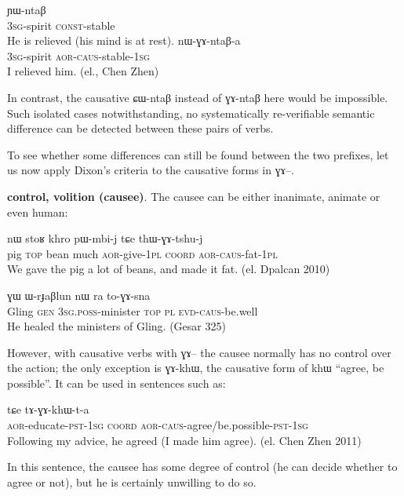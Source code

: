 \documentclass[oldfontcommands,oneside,a4paper,11pt]{memoir}
\newcommand{\ipa}[1]{{\phon #1}} %
\newcommand{\aor}{\textsc{aor}}
\newcommand{\caus}{\textsc{caus}}
\newcommand{\coord}{\textsc{coord}}
\newcommand{\const}{\textsc{const}}
\newcommand{\evd}{\textsc{evd}}
\newcommand{\gen}{\textsc{gen}}
\newcommand{\pl}{\textsc{pl}}
\newcommand{\poss}{\textsc{poss}}
\newcommand{\pst}{\textsc{pst}}
\newcommand{\sg}{\textsc{sg}}
\newcommand{\topic}{\textsc{top}}
\begin{document}
    \begin{exe}
   \ex 
  \gll    \ipa{ɯ-sɯm} \ipa{ɲɯ-ntaβ}   \\
  3\sg{}-spirit \const{}-stable \\
 \glt   He is relieved (his mind is at rest).
\gll    \ipa{ɯ-sɯm} \ipa{nɯ-ɣɤ-ntaβ-a}   \\
  3\sg{}-spirit \aor{}-\caus{}-stable-1\sg{} \\
 \glt   I relieved him. (el., Chen Zhen)
   \end{exe} 
In contrast, the causative \ipa{ɕɯ-ntaβ} instead of \ipa{ɣɤ-ntaβ} here would be impossible. Such isolated cases notwithstanding, no systematically re-verifiable semantic difference can be detected between these pairs of verbs.




To see whether some differences can still be found between the two prefixes, let us now apply Dixon's criteria to the causative forms in \ipa{ɣɤ}--.

 \textbf{control, volition (causee)}. The causee can be either inanimate, animate or even human:
   \begin{exe}
   \ex 
\gll  \ipa{paʁ}  	\ipa{nɯ}  	\ipa{stoʁ}  	\ipa{khro}  	\ipa{pɯ-mbi-j}  	\ipa{tɕe}  	\ipa{thɯ-ɣɤ-tshu-j}  \\
 pig \topic{} bean much \aor{}-give-1\pl{} \coord{} \aor{}-\caus{}-fat-1\pl{}\\
 \glt We gave the pig a lot of beans, and made it fat. (el. Dpalcan 2010)
   \end{exe} 
    \begin{exe}
   \ex 
\gll \ipa{ʁlaŋ}  	\ipa{ɣɯ}  	\ipa{ɯ-rɟaβlun}  	\ipa{nɯ}  	\ipa{ra}  	\ipa{to-ɣɤ-sna}      \\
Gling \gen{} 3\sg{}.\poss{}-minister \topic{} \pl{} \evd{}-\caus{}-be.well  \\
 \glt  He healed the ministers of Gling. (Gesar 325)
   \end{exe} 

   However, with causative verbs with \ipa{ɣɤ}--   the causee normally has no control over the action; the only exception is \ipa{ɣɤ-khɯ}, the causative form of \ipa{khɯ} ``agree, be possible''. It can be used in sentences such as:
   \begin{exe}
   \ex 
\gll    \ipa{tɤ-ndzɯmbra-t-a} \ipa{tɕe} \ipa{tɤ-ɣɤ-khɯ-t-a}\\
 \aor{}-educate-\pst{}-1\sg{} \coord{} \aor{}-\caus{}-agree/be.possible-\pst{}-1\sg{}\\
 \glt   Following my advice, he agreed (I made him agree). (el. Chen Zhen 2011)
   \end{exe} 
  In this sentence, the causee has some degree of control (he can decide whether to agree or not), but he is certainly unwilling to do so.
  
\end{document}
